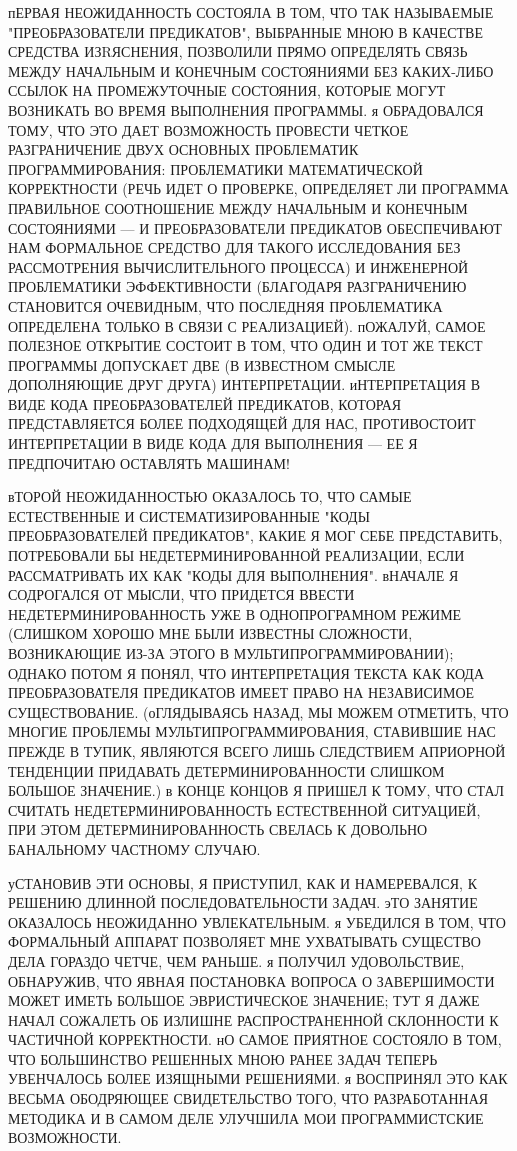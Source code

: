 пЕРВАЯ НЕОЖИДАННОСТЬ СОСТОЯЛА В ТОМ, ЧТО ТАК НАЗЫВАЕМЫЕ "ПРЕОБРАЗОВАТЕЛИ 
ПРЕДИКАТОВ", ВЫБРАННЫЕ МНОЮ В КАЧЕСТВЕ СРЕДСТВА ИЗRЯСНЕНИЯ, ПОЗВОЛИЛИ ПРЯМО
ОПРЕДЕЛЯТЬ СВЯЗЬ МЕЖДУ НАЧАЛЬНЫМ И КОНЕЧНЫМ СОСТОЯНИЯМИ БЕЗ КАКИХ-ЛИБО 
ССЫЛОК НА ПРОМЕЖУТОЧНЫЕ СОСТОЯНИЯ, КОТОРЫЕ МОГУТ ВОЗНИКАТЬ ВО ВРЕМЯ
ВЫПОЛНЕНИЯ ПРОГРАММЫ.  я ОБРАДОВАЛСЯ ТОМУ, ЧТО ЭТО ДАЕТ ВОЗМОЖНОСТЬ ПРОВЕСТИ 
ЧЕТКОЕ РАЗГРАНИЧЕНИЕ ДВУХ ОСНОВНЫХ ПРОБЛЕМАТИК ПРОГРАММИРОВАНИЯ:
ПРОБЛЕМАТИКИ  МАТЕМАТИЧЕСКОЙ КОРРЕКТНОСТИ (РЕЧЬ ИДЕТ О ПРОВЕРКЕ, ОПРЕДЕЛЯЕТ 
ЛИ ПРОГРАММА ПРАВИЛЬНОЕ  СООТНОШЕНИЕ МЕЖДУ НАЧАЛЬНЫМ И КОНЕЧНЫМ
СОСТОЯНИЯМИ --- И ПРЕОБРАЗОВАТЕЛИ ПРЕДИКАТОВ ОБЕСПЕЧИВАЮТ НАМ ФОРМАЛЬНОЕ 
СРЕДСТВО ДЛЯ ТАКОГО ИССЛЕДОВАНИЯ БЕЗ РАССМОТРЕНИЯ ВЫЧИСЛИТЕЛЬНОГО ПРОЦЕССА) 
И ИНЖЕНЕРНОЙ ПРОБЛЕМАТИКИ ЭФФЕКТИВНОСТИ (БЛАГОДАРЯ РАЗГРАНИЧЕНИЮ СТАНОВИТСЯ 
ОЧЕВИДНЫМ, ЧТО ПОСЛЕДНЯЯ ПРОБЛЕМАТИКА ОПРЕДЕЛЕНА ТОЛЬКО В СВЯЗИ С РЕАЛИЗАЦИЕЙ).
пОЖАЛУЙ, САМОЕ ПОЛЕЗНОЕ ОТКРЫТИЕ СОСТОИТ В ТОМ, ЧТО ОДИН И ТОТ ЖЕ ТЕКСТ 
ПРОГРАММЫ ДОПУСКАЕТ ДВЕ (В ИЗВЕСТНОМ СМЫСЛЕ ДОПОЛНЯЮЩИЕ ДРУГ ДРУГА) 
ИНТЕРПРЕТАЦИИ. иНТЕРПРЕТАЦИЯ В  ВИДЕ КОДА ПРЕОБРАЗОВАТЕЛЕЙ ПРЕДИКАТОВ, КОТОРАЯ 
ПРЕДСТАВЛЯЕТСЯ БОЛЕЕ ПОДХОДЯЩЕЙ ДЛЯ НАС,  ПРОТИВОСТОИТ ИНТЕРПРЕТАЦИИ В
ВИДЕ КОДА ДЛЯ  ВЫПОЛНЕНИЯ --- ЕЕ Я ПРЕДПОЧИТАЮ ОСТАВЛЯТЬ МАШИНАМ!

вТОРОЙ НЕОЖИДАННОСТЬЮ ОКАЗАЛОСЬ ТО, ЧТО САМЫЕ ЕСТЕСТВЕННЫЕ И 
СИСТЕМАТИЗИРОВАННЫЕ "КОДЫ ПРЕОБРАЗОВАТЕЛЕЙ ПРЕДИКАТОВ", КАКИЕ Я МОГ СЕБЕ
ПРЕДСТАВИТЬ, ПОТРЕБОВАЛИ БЫ  НЕДЕТЕРМИНИРОВАННОЙ РЕАЛИЗАЦИИ, ЕСЛИ РАССМАТРИВАТЬ 
ИХ КАК "КОДЫ ДЛЯ ВЫПОЛНЕНИЯ". вНАЧАЛЕ Я СОДРОГАЛСЯ ОТ МЫСЛИ, ЧТО ПРИДЕТСЯ 
ВВЕСТИ НЕДЕТЕРМИНИРОВАННОСТЬ УЖЕ В ОДНОПРОГРАМНОМ РЕЖИМЕ (СЛИШКОМ ХОРОШО МНЕ 
БЫЛИ ИЗВЕСТНЫ СЛОЖНОСТИ, ВОЗНИКАЮЩИЕ ИЗ-ЗА ЭТОГО В МУЛЬТИПРОГРАММИРОВАНИИ); 
ОДНАКО ПОТОМ Я ПОНЯЛ, ЧТО ИНТЕРПРЕТАЦИЯ ТЕКСТА КАК КОДА ПРЕОБРАЗОВАТЕЛЯ
ПРЕДИКАТОВ ИМЕЕТ ПРАВО НА НЕЗАВИСИМОЕ СУЩЕСТВОВАНИЕ. (оГЛЯДЫВАЯСЬ НАЗАД, 
МЫ МОЖЕМ ОТМЕТИТЬ, ЧТО МНОГИЕ ПРОБЛЕМЫ МУЛЬТИПРОГРАММИРОВАНИЯ, СТАВИВШИЕ НАС 
ПРЕЖДЕ В ТУПИК, ЯВЛЯЮТСЯ ВСЕГО ЛИШЬ СЛЕДСТВИЕМ АПРИОРНОЙ ТЕНДЕНЦИИ ПРИДАВАТЬ 
ДЕТЕРМИНИРОВАННОСТИ СЛИШКОМ БОЛЬШОЕ ЗНАЧЕНИЕ.)  в КОНЦЕ КОНЦОВ Я ПРИШЕЛ К
ТОМУ, ЧТО СТАЛ СЧИТАТЬ НЕДЕТЕРМИНИРОВАННОСТЬ ЕСТЕСТВЕННОЙ СИТУАЦИЕЙ, ПРИ ЭТОМ
ДЕТЕРМИНИРОВАННОСТЬ СВЕЛАСЬ К ДОВОЛЬНО БАНАЛЬНОМУ ЧАСТНОМУ СЛУЧАЮ.

уСТАНОВИВ ЭТИ ОСНОВЫ, Я ПРИСТУПИЛ, КАК И НАМЕРЕВАЛСЯ, К РЕШЕНИЮ ДЛИННОЙ 
ПОСЛЕДОВАТЕЛЬНОСТИ ЗАДАЧ. эТО ЗАНЯТИЕ ОКАЗАЛОСЬ НЕОЖИДАННО УВЛЕКАТЕЛЬНЫМ. я
УБЕДИЛСЯ В ТОМ, ЧТО ФОРМАЛЬНЫЙ АППАРАТ ПОЗВОЛЯЕТ МНЕ УХВАТЫВАТЬ СУЩЕСТВО 
ДЕЛА ГОРАЗДО ЧЕТЧЕ, ЧЕМ РАНЬШЕ. я ПОЛУЧИЛ УДОВОЛЬСТВИЕ, ОБНАРУЖИВ, ЧТО
ЯВНАЯ ПОСТАНОВКА ВОПРОСА О ЗАВЕРШИМОСТИ МОЖЕТ ИМЕТЬ БОЛЬШОЕ ЭВРИСТИЧЕСКОЕ 
ЗНАЧЕНИЕ; ТУТ Я ДАЖЕ НАЧАЛ СОЖАЛЕТЬ  ОБ ИЗЛИШНЕ РАСПРОСТРАНЕННОЙ СКЛОННОСТИ 
К ЧАСТИЧНОЙ КОРРЕКТНОСТИ. нО САМОЕ ПРИЯТНОЕ СОСТОЯЛО В ТОМ, ЧТО БОЛЬШИНСТВО 
РЕШЕННЫХ МНОЮ РАНЕЕ ЗАДАЧ ТЕПЕРЬ УВЕНЧАЛОСЬ БОЛЕЕ ИЗЯЩНЫМИ РЕШЕНИЯМИ. 
я ВОСПРИНЯЛ ЭТО КАК ВЕСЬМА ОБОДРЯЮЩЕЕ СВИДЕТЕЛЬСТВО ТОГО, ЧТО РАЗРАБОТАННАЯ 
МЕТОДИКА И В САМОМ ДЕЛЕ УЛУЧШИЛА МОИ ПРОГРАММИСТСКИЕ ВОЗМОЖНОСТИ.

